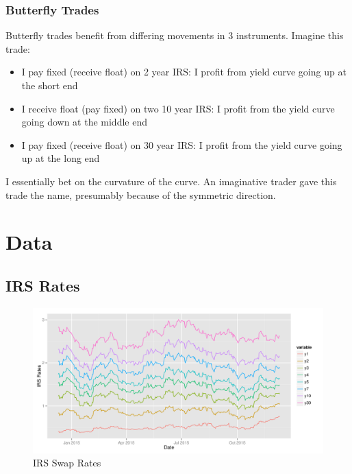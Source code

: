 \subsection{Butterfly Trades}

Butterfly trades benefit from differing movements in 3 instruments. Imagine this trade:

\begin{itemize}
\item I pay fixed (receive float) on 2 year IRS: I profit from yield curve going up at the short end
\item I receive float (pay fixed) on two 10 year IRS: I profit from the yield curve going down at the middle end
\item I pay fixed (receive float) on 30 year IRS: I profit from the yield curve going up at the long end
\end{itemize}

I essentially bet on the curvature of the curve. An imaginative trader gave this trade the name, presumably because of the symmetric direction.

\chapter{Data}

\section{IRS Rates}

\begin{figure}[H]
\centering\includegraphics[width=\textwidth]{descriptive-rates.pdf}
\caption{IRS Swap Rates}
\label{fig:descriptive-rates}
\end{figure}

